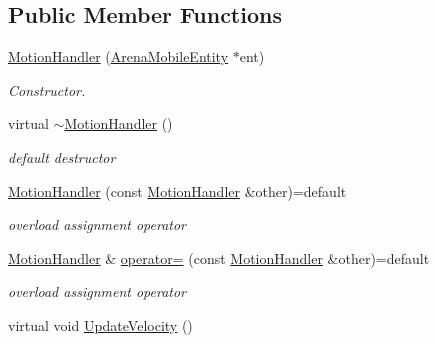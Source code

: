 \subsection*{Public Member Functions}
\begin{DoxyCompactItemize}
\item 
\hyperlink{classMotionHandler_a48c0070bfda6acb8a7493eb7fe1200c4}{Motion\+Handler} (\hyperlink{classArenaMobileEntity}{Arena\+Mobile\+Entity} $\ast$ent)\hypertarget{classMotionHandler_a48c0070bfda6acb8a7493eb7fe1200c4}{}\label{classMotionHandler_a48c0070bfda6acb8a7493eb7fe1200c4}

\begin{DoxyCompactList}\small\item\em Constructor. \end{DoxyCompactList}\item 
virtual \hyperlink{classMotionHandler_aeb9e090d5d5f750767ea82d604f11c9c}{$\sim$\+Motion\+Handler} ()\hypertarget{classMotionHandler_aeb9e090d5d5f750767ea82d604f11c9c}{}\label{classMotionHandler_aeb9e090d5d5f750767ea82d604f11c9c}

\begin{DoxyCompactList}\small\item\em default destructor \end{DoxyCompactList}\item 
\hyperlink{classMotionHandler_a91dc98beab9d5ccce6b6c18ce32c0488}{Motion\+Handler} (const \hyperlink{classMotionHandler}{Motion\+Handler} \&other)=default\hypertarget{classMotionHandler_a91dc98beab9d5ccce6b6c18ce32c0488}{}\label{classMotionHandler_a91dc98beab9d5ccce6b6c18ce32c0488}

\begin{DoxyCompactList}\small\item\em overload assignment operator \end{DoxyCompactList}\item 
\hyperlink{classMotionHandler}{Motion\+Handler} \& \hyperlink{classMotionHandler_ad45188f2d9794fd2b257d586a7b522e6}{operator=} (const \hyperlink{classMotionHandler}{Motion\+Handler} \&other)=default\hypertarget{classMotionHandler_ad45188f2d9794fd2b257d586a7b522e6}{}\label{classMotionHandler_ad45188f2d9794fd2b257d586a7b522e6}

\begin{DoxyCompactList}\small\item\em overload assignment operator \end{DoxyCompactList}\item 
virtual void \hyperlink{classMotionHandler_ad9bfac3d0ec3cec1d607f41475886c3c}{Update\+Velocity} ()\hypertarget{classMotionHandler_ad9bfac3d0ec3cec1d607f41475886c3c}{}\label{classMotionHandler_ad9bfac3d0ec3cec1d607f41475886c3c}


\end{DoxyCompactItemize}

